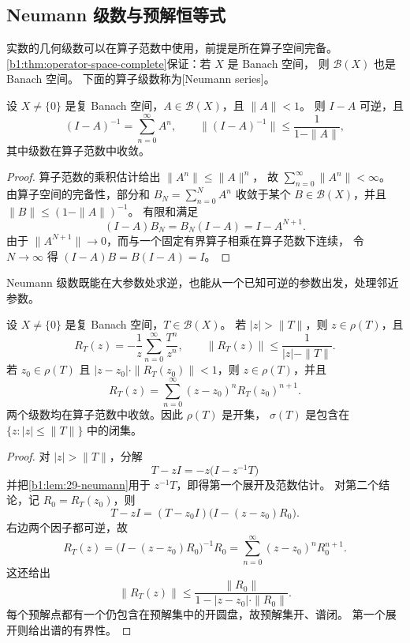 \subsection{Neumann 级数与预解恒等式}
\label{b1:subsec:290102}

实数的几何级数可以在算子范数中使用，前提是所在算子空间完备。
\cref{b1:thm:operator-space-complete}保证：若 \(X\) 是 Banach 空间，
则 \(\mathcal B(X)\) 也是 Banach 空间。
下面的算子级数称为[Neumann series]。

\begin{lemma}[Neumann 级数]
\label{b1:lem:29-neumann}
设 \(X\ne\{0\}\) 是复 Banach 空间，\(A\in\mathcal B(X)\)，且 \(\|A\|<1\)。
则 \(I-A\) 可逆，且
\[
 (I-A)^{-1}=\sum_{n=0}^{\infty}A^n,\qquad
 \|(I-A)^{-1}\|\leq\frac{1}{1-\|A\|},
\]
其中级数在算子范数中收敛。
\end{lemma}

\begin{proof}
算子范数的乘积估计给出 \(\|A^n\|\leq\|A\|^n\)，
故 \(\sum_{n=0}^{\infty}\|A^n\|<\infty\)。
由算子空间的完备性，部分和 \(B_N=\sum_{n=0}^N A^n\) 收敛于某个
\(B\in\mathcal B(X)\)，并且 \(\|B\|\leq(1-\|A\|)^{-1}\)。
有限和满足
\[
 (I-A)B_N=B_N(I-A)=I-A^{N+1}.
\]
由于 \(\|A^{N+1}\|\to0\)，而与一个固定有界算子相乘在算子范数下连续，
令 \(N\to\infty\) 得 \((I-A)B=B(I-A)=I\)。
\end{proof}

Neumann 级数既能在大参数处求逆，也能从一个已知可逆的参数出发，处理邻近参数。

\begin{proposition}[预解集的开性与局部展开]
\label{b1:prop:29-resolvent-local}
设 \(X\ne\{0\}\) 是复 Banach 空间，\(T\in\mathcal B(X)\)。
若 \(|z|>\|T\|\)，则 \(z\in\rho(T)\)，且
\[
 R_T(z)=-\frac1z\sum_{n=0}^{\infty}\frac{T^n}{z^n},\qquad
 \|R_T(z)\|\leq\frac{1}{|z|-\|T\|}.
\]
若 \(z_0\in\rho(T)\) 且 \(|z-z_0|\cdot\|R_T(z_0)\|<1\)，则
\(z\in\rho(T)\)，并且
\[
 R_T(z)=\sum_{n=0}^{\infty}(z-z_0)^nR_T(z_0)^{n+1}.
\]
两个级数均在算子范数中收敛。因此 \(\rho(T)\) 是开集，
\(\sigma(T)\) 是包含在 \(\{z:|z|\leq\|T\|\}\) 中的闭集。
\end{proposition}

\begin{proof}
对 \(|z|>\|T\|\)，分解
\[
 T-zI=-z\bigl(I-z^{-1}T\bigr)
\]
并把\cref{b1:lem:29-neumann}用于 \(z^{-1}T\)，即得第一个展开及范数估计。
对第二个结论，记 \(R_0=R_T(z_0)\)，则
\[
 T-zI=(T-z_0I)\bigl(I-(z-z_0)R_0\bigr).
\]
右边两个因子都可逆，故
\[
 R_T(z)=\bigl(I-(z-z_0)R_0\bigr)^{-1}R_0
       =\sum_{n=0}^{\infty}(z-z_0)^nR_0^{n+1}.
\]
这还给出
\[
 \|R_T(z)\|\leq
 \frac{\|R_0\|}{1-|z-z_0|\cdot\|R_0\|}.
\]
每个预解点都有一个仍包含在预解集中的开圆盘，故预解集开、谱闭。
第一个展开则给出谱的有界性。
\end{proof}

